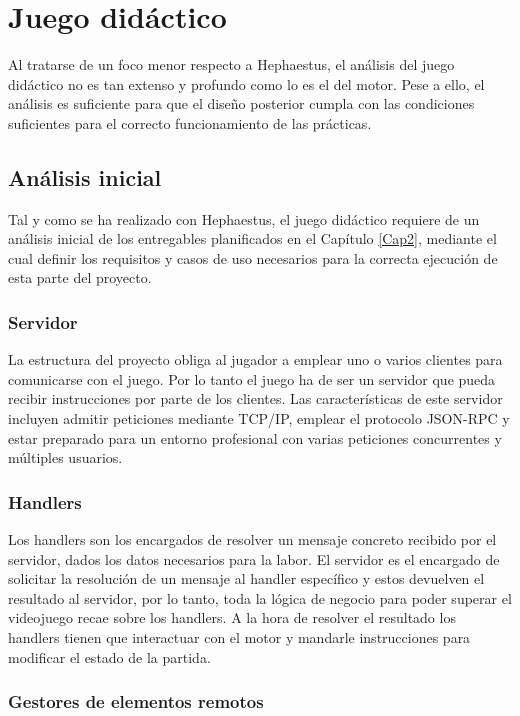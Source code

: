 \section{Juego didáctico}

Al tratarse de un foco menor respecto a Hephaestus, el análisis del juego didáctico no es tan extenso y profundo como lo es el del motor. Pese a ello, el análisis es suficiente para que el diseño posterior cumpla con las condiciones suficientes para el correcto funcionamiento de las prácticas.

\subsection{Análisis inicial}

Tal y como se ha realizado con Hephaestus, el juego didáctico requiere de un análisis inicial de los entregables planificados en el Capítulo \ref{Cap2}, mediante el cual definir los requisitos y casos de uso necesarios para la correcta ejecución de esta parte del proyecto.

\subsubsection{Servidor}

La estructura del proyecto obliga al jugador a emplear uno o varios clientes para comunicarse con el juego. Por lo tanto el juego ha de ser un servidor que pueda recibir instrucciones por parte de los clientes. Las características de este servidor incluyen admitir peticiones mediante TCP/IP, emplear el protocolo JSON-RPC y estar preparado para un entorno profesional con varias peticiones concurrentes y múltiples usuarios.

\subsubsection{Handlers}

Los handlers son los encargados de resolver un mensaje concreto recibido por el servidor, dados los datos necesarios para la labor. El servidor es el encargado de solicitar la resolución de un mensaje al handler específico y estos devuelven el resultado al servidor, por lo tanto, toda la lógica de negocio para poder superar el videojuego recae sobre los handlers. A la hora de resolver el resultado los handlers tienen que interactuar con el motor y mandarle instrucciones para modificar el estado de la partida.

\subsubsection{Gestores de elementos remotos}

